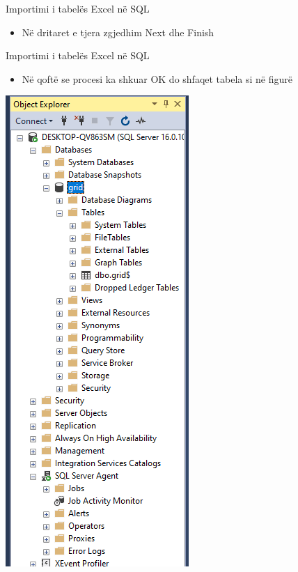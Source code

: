 \documentclass[
  ignorenonframetext,
]{beamer}
\providecommand{\tightlist}{%
  \setlength{\itemsep}{0pt}\setlength{\parskip}{0pt}}
\begin{document}
\begin{frame}{Importimi i tabelës Excel në SQL}
\label{importimi-i-tabeluxebs-excel-nuxeb-sql-6}
\begin{itemize}
\tightlist
\item
  Në dritaret e tjera zgjedhim Next dhe Finish
\end{itemize}
\end{frame}

\begin{frame}{Importimi i tabelës Excel në SQL}
\label{importimi-i-tabeluxebs-excel-nuxeb-sql-7}
\begin{itemize}
\tightlist
\item
  Në qoftë se procesi ka shkuar OK do shfaqet tabela si në figurë
\end{itemize}

\includegraphics{./Figs/db8.png}
\end{frame}
\end{document}
